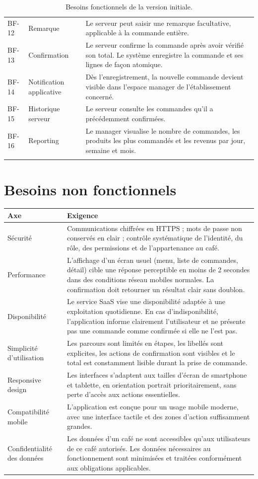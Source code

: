 \documentclass[11pt,a4paper]{article}
\begin{document}
\begin{longtable}{P{0.12\textwidth}P{0.24\textwidth}P{0.55\textwidth}}
BF-12 & Remarque & Le serveur peut saisir une remarque facultative, applicable à la commande entière. \\
BF-13 & Confirmation & Le serveur confirme la commande après avoir vérifié son total. Le système enregistre la commande et ses lignes de façon atomique. \\
BF-14 & Notification applicative & Dès l’enregistrement, la nouvelle commande devient visible dans l’espace manager de l’établissement concerné. \\
BF-15 & Historique serveur & Le serveur consulte les commandes qu’il a précédemment confirmées. \\
BF-16 & Reporting & Le manager visualise le nombre de commandes, les produits les plus commandés et les revenus par jour, semaine et mois. \\
\bottomrule
\caption{Besoins fonctionnels de la version initiale.}\label{tab:functional-needs}
\end{longtable}

\section{Besoins non fonctionnels}
\begin{tabularx}{\textwidth}{P{0.25\textwidth}Y}
\toprule
\textbf{Axe} & \textbf{Exigence} \\
\midrule
Sécurité & Communications chiffrées en HTTPS ; mots de passe non conservés en clair ; contrôle systématique de l’identité, du rôle, des permissions et de l’appartenance au café. \\
Performance & L’affichage d’un écran usuel (menu, liste de commandes, détail) cible une réponse perceptible en moins de 2 secondes dans des conditions réseau mobiles normales. La confirmation doit retourner un résultat clair sans doublon. \\
Disponibilité & Le service SaaS vise une disponibilité adaptée à une exploitation quotidienne. En cas d’indisponibilité, l’application informe clairement l’utilisateur et ne présente pas une commande comme confirmée si elle ne l’est pas. \\
Simplicité d’utilisation & Les parcours sont limités en étapes, les libellés sont explicites, les actions de confirmation sont visibles et le total est constamment lisible durant la prise de commande. \\
Responsive design & Les interfaces s’adaptent aux tailles d’écran de smartphone et tablette, en orientation portrait prioritairement, sans perte d’accès aux actions essentielles. \\
Compatibilité mobile & L’application est conçue pour un usage mobile moderne, avec une interface tactile et des zones d’action suffisamment grandes. \\
Confidentialité des données & Les données d’un café ne sont accessibles qu’aux utilisateurs de ce café autorisés. Les données nécessaires au fonctionnement sont minimisées et traitées conformément aux obligations applicables. \\
\bottomrule
\end{tabularx}
\end{document}
